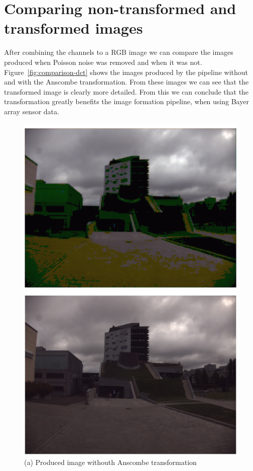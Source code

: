 \documentclass[12pt,a4paper,english
]{tunithesis}
\begin{document}
\section{Comparing non-transformed and transformed images}
After combining the channels to a RGB image we can compare the images produced when Poisson noise was removed and when it was not. Figure~\ref{fig:comparison-dct} shows the images produced by the pipeline without and with the Anscombe transformation. From these images we can see that the transformed image is clearly more detailed. From this we can conclude that the transformation greatly benefits the image formation pipeline, when using Bayer array sensor data.

\begin{figure}[h]
  \centering
  \begin{minipage}[b]{0.45\textwidth}
    \includegraphics[width=\textwidth]{img/non-transformed-dct.png}
    \caption*{(a) Produced image withouth Anscombe transformation}
  \end{minipage}
  \hfill
  \begin{minipage}[b]{0.45\textwidth}
    \includegraphics[width=\textwidth]{img/transformed-dct.png}

\end{minipage}
\end{figure}
\end{document}

